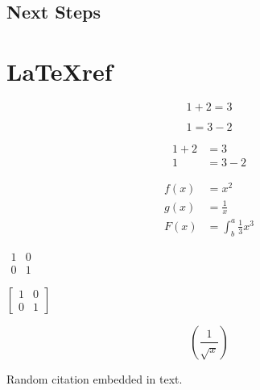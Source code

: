\documentclass{article}
\begin{document}
\subsection{Next Steps}

\section{\LaTeX ref}

	\begin{equation*}
		1 + 2 = 3 
	\end{equation*}
	
	\begin{equation*}
		1 = 3 - 2
	\end{equation*}
	
	\begin{align*}
		1 + 2 &= 3\\
		1 &= 3 - 2
	\end{align*}

	\begin{align*}
		f(x) &= x^2\\
		g(x) &= \frac{1}{x}\\
		F(x) &= \int^a_b \frac{1}{3}x^3
	\end{align*}

	$\begin{matrix}
		1 & 0\\
		0 & 1
	\end{matrix}$

	$\left[
	\begin{matrix}
		1 & 0\\
		0 & 1
	\end{matrix}
	\right]$

	\begin{equation*}
		\left(\frac{1}{\sqrt{x}}\right)
	\end{equation*}

Random citation \cite{DUMMY:1} embedded in text.

\newpage



	
\end{document}
